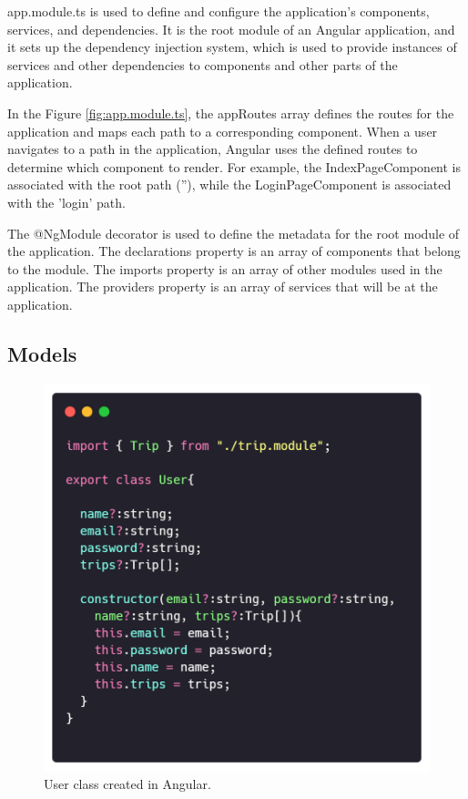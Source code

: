 \documentclass{article}
\begin{document}
  app.module.ts is used to define and configure the application's components, services, and dependencies. It is the root module of an Angular application, and it sets up the dependency injection system, which is used to provide instances of services and other dependencies to components and other parts of the application.

  In the Figure \ref{fig:app.module.ts}, the appRoutes array defines the routes for the application and maps each path to a corresponding component. When a user navigates to a path in the application, Angular uses the defined routes to determine which component to render. For example, the IndexPageComponent is associated with the root path (''), while the LoginPageComponent is associated with the 'login' path. 
  
  The @NgModule decorator is used to define the metadata for the root module of the application. The declarations property is an array of components that belong to the module. The imports property is an array of other modules used in the application. The providers property is an array of services that will be at the application.

  \subsection*{Models}

  \begin{figure}[h]
    \centering
    \includegraphics[width=0.8\columnwidth]{figures/user.module.ts.png}
    \caption{User class created in Angular.\label{fig:user.module.ts}}
    \end{figure}
    
\end{document}
